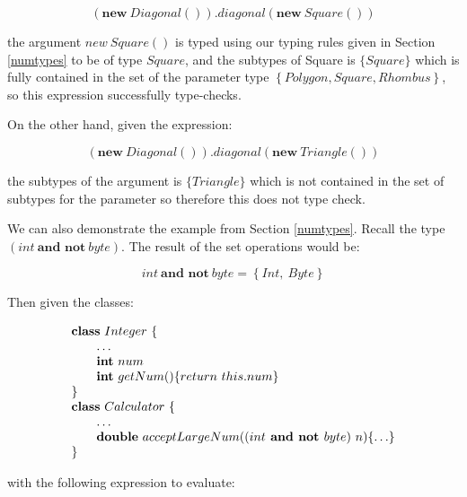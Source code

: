 \documentclass{l4proj}
\begin{document}
\begin{equation}
    (\textbf{new}\ Diagonal()).diagonal(\textbf{new}\ Square())
\end{equation}

the argument $new\ Square()$ is typed using our typing rules given in Section \ref{numtypes} to be of type $Square$, and the subtypes of Square is $\{ Square \}$ which is fully contained in the set of the parameter type $\left\{Polygon, Square, Rhombus \right\}$, so this expression successfully type-checks.

On the other hand, given the expression:

\begin{equation}
    (\textbf{new}\ Diagonal()).diagonal(\textbf{new}\ Triangle())
\end{equation}

the subtypes of the argument is $\{ Triangle \}$ which is not contained in the set of subtypes for the parameter so therefore this does not type check.

We can also demonstrate the example from Section \ref{numtypes}. Recall the type $(int\ \textbf{and not}\ byte)$. The result of the set operations would be:

\begin{equation}
    \label{eq:intnotbyte}
    int\ \textbf{and not}\ byte = \left\{Int,\ Byte\right\}
\end{equation}

Then given the classes:

\begin{equation}
    \begin{array}{l}
        \mathbf{class} \ {Integer} \ \{
        \\
        \qquad \ldots
        \\
        \qquad \textbf{int}\ num
        \\
        \qquad \textbf{int}\ getNum()\{return\ this.num\}
        \\
        \}
        \\
        \mathbf{class} \ {Calculator}\ \{
        \\
        \qquad \ldots \\
        \qquad \textbf{double}\ acceptLargeNum((int \textbf{ and not } byte) \ n)\{\ldots\}
        \\
        \}
    \end{array}
\end{equation}

with the following expression to evaluate:
\end{document}
